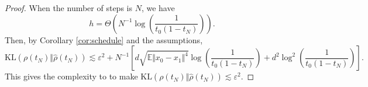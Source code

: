 \begin{proof}
    When the number of steps is $N$, we have 
    $$h=\Theta\left(N^{-1}\log\left(\frac{1}{t_0(1-t_N)}\right)\right).$$ 
    Then, by Corollary \ref{cor:schedule} and the assumptions,
    $$\text{KL}(\rho(t_N)\Vert\hat{\rho}(t_N))\lesssim\varepsilon^2+N^{-1}\left[d\sqrt{\mathbb{E}\Vert x_0-x_1\Vert^4}\log\left(\frac{1}{t_0(1-t_N)}\right)+d^2\log^2\left(\frac{1}{t_0(1-t_N)}\right)\right].$$
    This gives the complexity to to make $\text{KL}(\rho(t_N)\Vert\hat{\rho}(t_N))\lesssim\varepsilon^2$.
\end{proof}

